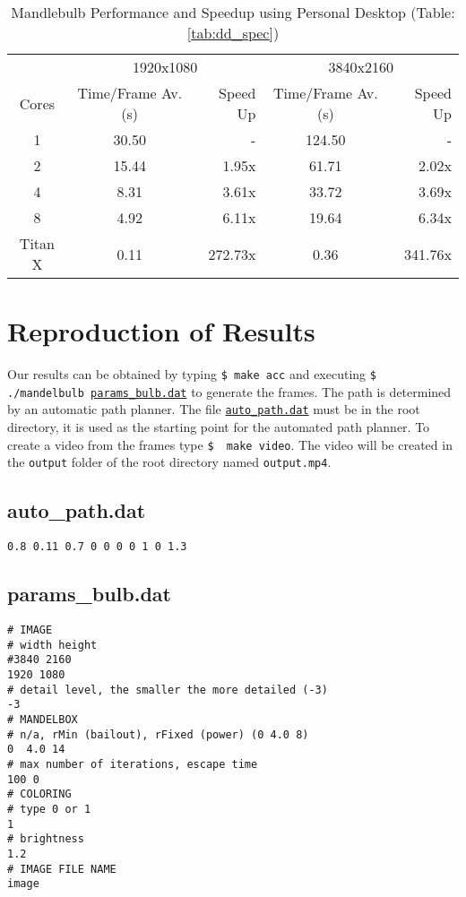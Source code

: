 \documentclass[]{article}
\begin{document}
\begin{table}[h!]
\centering
\begin{tabular}{|c|c|r|c|r|} \hline
& \multicolumn{2}{c|}{1920x1080} & \multicolumn{2}{c|}{3840x2160} \\ \cline{2-5}
Cores & Time/Frame Av. (s)  & Speed Up & Time/Frame Av. (s) & Speed Up \\ 
\hline
1 & 30.50 & - & 124.50 & -\\
2 & 15.44 & 1.95x & 61.71  & 2.02x \\
4 & 8.31  & 3.61x & 33.72  & 3.69x\\
8 & 4.92  & 6.11x & 19.64  & 6.34x\\ 
\hline
Titan X & 0.11 & 272.73x & 0.36 & 341.76x\\ \hline
\end{tabular}
\caption{Mandlebulb Performance and Speedup using Personal Desktop (Table: \ref{tab:dd_spec}) }
\end{table}

\section{Reproduction of Results}
Our results can be obtained by typing \texttt{\$ make acc} and executing \texttt{\$ ./mandelbulb \hyperref[subsec:params_bulb]{params\_bulb.dat}} to generate the frames. The path is determined by an automatic path planner. The file \texttt{\hyperref[subsec:auto_path]{auto\_path.dat}} must be in the root directory, it is used as the starting point for the automated path planner. To create a video from the frames type \texttt{\$~ make video}. The video will be created in the \texttt{output} folder of the root directory named \texttt{output.mp4}.

\subsection{auto\_path.dat}\label{subsec:auto_path}
\begin{Verbatim}[fontsize= \footnotesize, tabsize=4]
0.8 0.11 0.7 0 0 0 0 1 0 1.3
\end{Verbatim}

\subsection{params\_bulb.dat}\label{subsec:params_bulb}
\begin{Verbatim}[fontsize= \footnotesize, tabsize=4]
# IMAGE
# width height
#3840 2160
1920 1080
# detail level, the smaller the more detailed (-3)
-3
# MANDELBOX
# n/a, rMin (bailout), rFixed (power) (0 4.0 8)
0  4.0 14
# max number of iterations, escape time
100 0
# COLORING
# type 0 or 1
1
# brightness
1.2
# IMAGE FILE NAME
image
\end{Verbatim}
\end{document}
